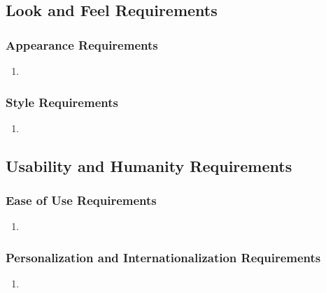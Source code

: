 \documentclass[]{article}
\begin{document}
\subsection{Look and Feel Requirements}
\label{sub:look_and_feel_requirements}

\subsubsection{Appearance Requirements}
\label{ssub:appearance_requirements}
\begin{enumerate}[{LF}1. ]
	\item 
\end{enumerate}

\subsubsection{Style Requirements}
\label{ssub:style_requirements}
\begin{enumerate}[{LF}1. ]
	\item 
\end{enumerate}


\subsection{Usability and Humanity Requirements}
\label{sub:usability_and_humanity_requirements}

\subsubsection{Ease of Use Requirements}
\label{ssub:ease_of_use_requirements}
\begin{enumerate}[{UH}1. ]
	\item 
\end{enumerate}

\subsubsection{Personalization and Internationalization Requirements}
\label{ssub:personalization_and_internationalization_requirements}
\begin{enumerate}[{UH}1. ]
	\item 
\end{enumerate}
\end{document}
